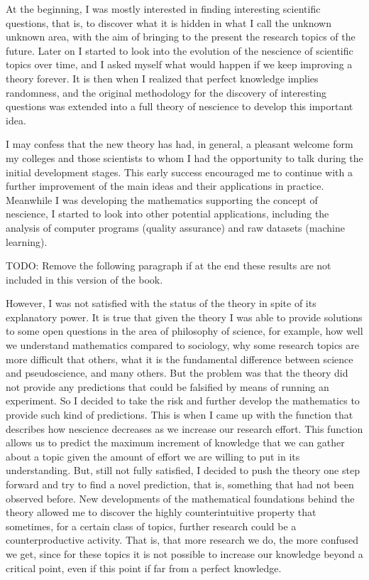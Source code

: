 At the beginning, I was mostly interested in finding interesting scientific questions, that is, to discover what it is hidden in what I call the unknown unknown area, with the aim of bringing to the present the research topics of the future. Later on I started to look into the evolution of the nescience of scientific topics over time, and I asked myself what would happen if we keep improving a theory forever. It is then when I realized that perfect knowledge implies randomness, and the original methodology for the discovery of interesting questions was extended into a full theory of nescience to develop this important idea.

I may confess that the new theory has had, in general, a pleasant welcome form my colleges and those scientists to whom I had the opportunity to talk during the initial development stages. This early success encouraged me to continue with a further improvement of the main ideas and their applications in practice. Meanwhile I was developing the mathematics supporting the concept of nescience, I started to look into other potential applications, including the analysis of computer programs (quality assurance) and raw datasets (machine learning).

{\color{red} TODO: Remove the following paragraph if at the end these results are not included in this version of the book.}

However, I was not satisfied with the status of the theory in spite of its explanatory power. It is true that given the theory I was able to provide solutions to some open questions in the area of philosophy of science, for example, how well we understand mathematics compared to sociology, why some research topics are more difficult that others, what it is the fundamental difference between science and pseudoscience, and many others. But the problem was that the theory did not provide any predictions that could be falsified by means of running an experiment. So I decided to take the risk and further develop the mathematics to provide such kind of predictions. This is when I came up with the function that describes how nescience decreases as we increase our research effort. This function allows us to predict the maximum increment of knowledge that we can gather about a topic given the amount of effort we are willing to put in its understanding. But, still not fully satisfied, I decided to push the theory one step forward and try to find a novel prediction, that is, something that had not been observed before. New developments of the mathematical foundations behind the theory allowed me to discover the highly counterintuitive property that sometimes, for a certain class of topics, further research could be a counterproductive activity. That is, that more research we do, the more confused we get, since for these topics it is not possible to increase our knowledge beyond a critical point, even if this point if far from a perfect knowledge.

